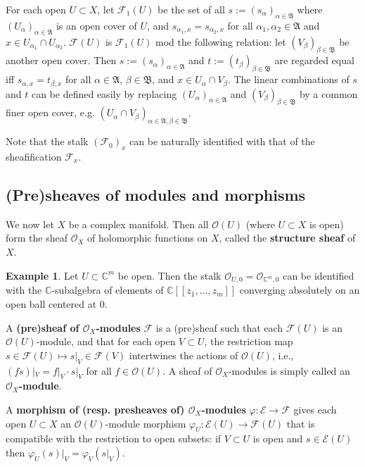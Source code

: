 \documentclass[12pt,a4paper,notitlepage]{article}
\theoremstyle{definition}
\newtheorem{eg}[df]{Example}
\theoremstyle{plain}
\newcommand{\fk}{\mathfrak}
\newcommand{\scr}{\mathscr}
\newcommand{\Cbb}{\mathbb C}
\numberwithin{equation}{section}
\begin{document}
For each open $U\subset X$, let $\scr F_1(U)$ be the set of all $s:=(s_\alpha)_{\alpha\in\fk A}$ where $(U_\alpha)_{\alpha\in\fk A}$ is an open cover of $U$, and $s_{\alpha_1,x}=s_{\alpha_2,x}$ for all $\alpha_1,\alpha_2\in\fk A$ and $x\in U_{\alpha_1}\cap U_{\alpha_2}$. $\scr F(U)$ is $\scr F_1(U)$ mod the following relation: let $(V_\beta)_{\beta\in\fk B}$ be another open cover. Then $s:=(s_\alpha)_{\alpha\in\fk A}$ and $t:=(t_\beta)_{\beta\in\fk B}$ are regarded equal iff $s_{\alpha,x}=t_{\beta,x}$ for all $\alpha\in\fk A$, $\beta\in\fk B$, and $x\in U_\alpha\cap V_\beta$. The linear combinations of $s$ and $t$ can be defined easily by replacing $(U_\alpha)_{\alpha\in\fk A}$ and $(V_\beta)_{\beta\in\fk B}$ by a common finer open cover, e.g. $(U_\alpha\cap V_\beta)_{\alpha\in\fk A,\beta\in\fk B}$.


Note that the stalk $(\scr F_0)_x$ can be naturally identified with that of the sheafification $\scr F_x$.


\subsection{(Pre)sheaves of modules and morphisms}

We now let $X$ be a complex manifold. Then all $\scr O(U)$ (where $U\subset X$ is open) form the sheaf $\scr O_X$ of holomorphic functions on $X$, called the \textbf{structure sheaf} of $X$.

\begin{eg}
Let $U\subset\Cbb^m$ be open. Then the stalk $\scr O_{U,0}=\scr O_{\Cbb^m,0}$ can be identified with the $\Cbb$-subalgebra of elements of $\Cbb[[z_1,\dots,z_m]]$ converging absolutely on an open ball centered at $0$.
\end{eg}

A \textbf{(pre)sheaf of $\scr O_X$-modules} $\scr F$ is a (pre)sheaf such that each $\scr F(U)$ is an $\scr O(U)$-module, and that for each open $V\subset U$, the restriction map $s\in\scr F(U)\mapsto s|_V\in\scr F(V)$ intertwines the actions of $\scr O(U)$, i.e., $(fs)|_V=f|_V\cdot s|_V$ for all $f\in\scr O(U)$. A sheaf of $\scr O_X$-modules is simply called an \textbf{$\scr O_X$-module}.


A \textbf{morphism of (resp. presheaves of) $\scr O_X$-modules} $\varphi:\scr E\rightarrow\scr F$ gives each open $U\subset X$ an $\scr O(U)$-module morphism $\varphi_U:\scr E(U)\rightarrow\scr F(U)$ that is compatible with the restriction to open subsets: if $V\subset U$ is open and $s\in\scr E(U)$ then $\varphi_U(s)|_V=\varphi_V(s|_V)$.  
\end{document}
